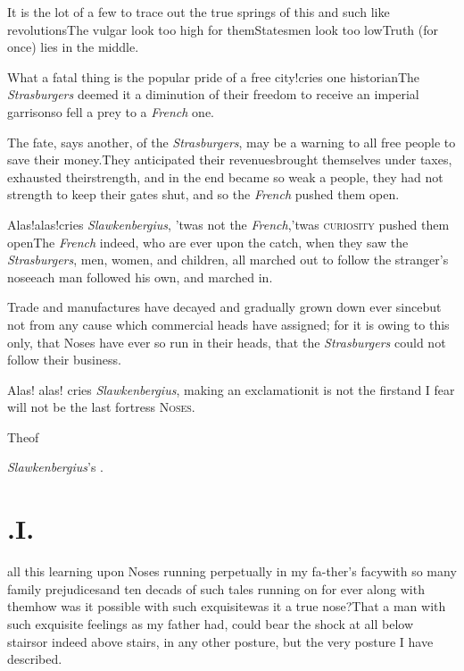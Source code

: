 \documentclass{article}
\begin{document}
It is the lot of a few to trace out the true springs of this and
such like revolutions\tsk The vulgar look too high for
them\tsk Statesmen look too low\tsk Truth (for once)
lies in the middle.

\newpage
What a fatal thing is the popular pride of a free city!\@ cries
one historian\tsk The \textit{Strasburgers} deemed it a diminution
of their freedom to receive an imperial garrison\tsk so
fell a prey to a \textit{French} one.

The fate, says another, of the \textit{Strasburgers}, may be a
warning to all free people to save their money.\tsk They
anticipated their revenues\tsk brought themselves under
taxes, exhausted their\break strength, and in the end became so weak a
people, they had not strength to keep their gates shut, and so the
\textit{French} pushed them open.

Alas!\@ alas!\@ cries \textit{Slawkenbergius}, ’twas not the
\textit{French},\tsk ’twas \textsc{curiosity}
pushed them open\tsk The \textit{French} indeed, who are
ever upon the catch, when they saw the \textit{Strasburgers}, men,
women, and children, all marched out to follow the stranger’s
nose\tsh each man followed his own, and marched in.

Trade and manufactures have decayed and gradually grown down
ever since\tsk but not from any cause which commercial heads have
assigned; for it is owing to this only, that Noses have ever so run
in their heads, that the \textit{Strasburgers} could not follow their
business.

Alas! alas! cries \textit{Slawkenbergius}, ma\-king an
exclamation\tsk it is not the first\tsh and I fear will not be the last
fortress
\break
\textsc{Noses}.

\bigskip
\centerline{The\enspace {}\enspace of}
\centerline{\textit{Slawkenbergius}’s .}

\bigskip

\newpage\null
\section{.\enspace I.}

 all this learning upon Noses
running perpetually in my fa-\break ther’s facy\sic\tsk with so
many family prejudices\tsk and ten decads of such tales
running on for ever along with them\tsk how was it possible
with such exquisite\tsk was it a true nose?\tsk That a man
with such exquisite feelings as my father had, could bear
the shock at all below stairs\tsk or indeed above stairs, in
any other posture, but the very posture I have described.
\end{document}
